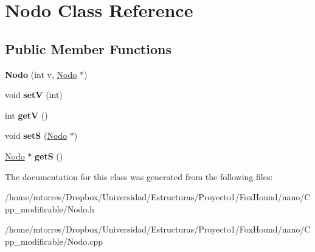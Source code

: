 \hypertarget{class_nodo}{\section{Nodo Class Reference}
\label{class_nodo}
}
\subsection*{Public Member Functions}
\begin{DoxyCompactItemize}
\item 
\hypertarget{class_nodo_adb9b7b95f8632f18d8fc06f196d284a3}{{\bfseries Nodo} (int v, \hyperlink{class_nodo}{Nodo} $\ast$)}\label{class_nodo_adb9b7b95f8632f18d8fc06f196d284a3}

\item 
\hypertarget{class_nodo_a22b287e6e0c09d50ae572333a319afbd}{void {\bfseries set\-V} (int)}\label{class_nodo_a22b287e6e0c09d50ae572333a319afbd}

\item 
\hypertarget{class_nodo_ac6488b06a6cce4fc6044831664906c31}{int {\bfseries get\-V} ()}\label{class_nodo_ac6488b06a6cce4fc6044831664906c31}

\item 
\hypertarget{class_nodo_a5b3d54d4527ba9ac49a27bd56a0e4523}{void {\bfseries set\-S} (\hyperlink{class_nodo}{Nodo} $\ast$)}\label{class_nodo_a5b3d54d4527ba9ac49a27bd56a0e4523}

\item 
\hypertarget{class_nodo_adc1881792620fb0a3eff19989004b34a}{\hyperlink{class_nodo}{Nodo} $\ast$ {\bfseries get\-S} ()}\label{class_nodo_adc1881792620fb0a3eff19989004b34a}

\end{DoxyCompactItemize}


The documentation for this class was generated from the following files\-:\begin{DoxyCompactItemize}
\item 
/home/mtorres/\-Dropbox/\-Universidad/\-Estructuras/\-Proyecto1/\-Fox\-Hound/nano/\-Cpp\-\_\-modificable/Nodo.\-h\item 
/home/mtorres/\-Dropbox/\-Universidad/\-Estructuras/\-Proyecto1/\-Fox\-Hound/nano/\-Cpp\-\_\-modificable/Nodo.\-cpp\end{DoxyCompactItemize}
